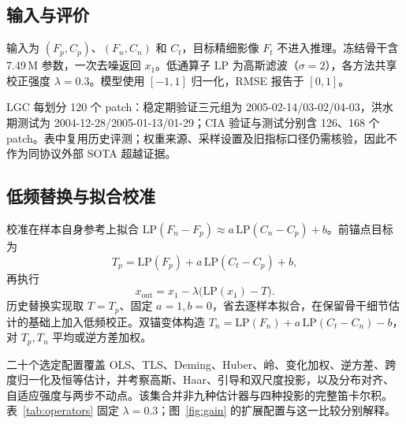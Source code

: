 \documentclass{article}
\begin{document}
\subsection{输入与评价}
输入为 $(F_p,C_p)$、$(F_n,C_n)$ 和 $C_t$，目标精细影像 $F_t$ 不进入推理。冻结骨干含 7.49\,M 参数，一次去噪返回 $x_1$。低通算子 $\mathrm{LP}$ 为高斯滤波（$\sigma=2$），各方法共享校正强度 $\lambda=0.3$。模型使用 $[-1,1]$ 归一化，RMSE 报告于 $[0,1]$。

LGC 每划分 120 个 patch：稳定期验证三元组为 2005-02-14/03-02/04-03，洪水期测试为 2004-12-28/2005-01-13/01-29；CIA 验证与测试分别含 126、168 个 patch。表中复用历史评测；权重来源、采样设置及旧指标口径仍需核验，因此不作为同协议外部 SOTA 超越证据。

\subsection{低频替换与拟合校准}
校准在样本自身参考上拟合 $\mathrm{LP}(F_n-F_p)\approx a\,\mathrm{LP}(C_n-C_p)+b$。前锚点目标为
\begin{equation}
T_p=\mathrm{LP}(F_p)+a\,\mathrm{LP}(C_t-C_p)+b,
\label{eq:target}
\end{equation}
再执行
\begin{equation}
x_{\mathrm{out}}=x_1-\lambda\bigl(\mathrm{LP}(x_1)-T\bigr).
\label{eq:proj}
\end{equation}
历史替换实现取 $T=T_p$、固定 $a=1,b=0$，省去逐样本拟合，在保留骨干细节估计的基础上加入低频校正。双锚变体构造 $T_n=\mathrm{LP}(F_n)+a\,\mathrm{LP}(C_t-C_n)-b$，对 $T_p,T_n$ 平均或逆方差加权。

二十个选定配置覆盖 OLS、TLS、Deming、Huber、岭、变化加权、逆方差、跨度归一化及恒等估计，并考察高斯、Haar、引导和双尺度投影，以及分布对齐、自适应强度与两步不动点。该集合并非九种估计器与四种投影的完整笛卡尔积。表~\ref{tab:operators} 固定 $\lambda=0.3$；图~\ref{fig:gain} 的扩展配置与这一比较分别解释。
\end{document}
